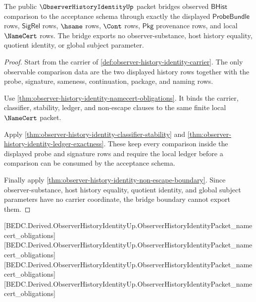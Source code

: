 \begin{theorem}
\label{thm:observer-history-identity-bridge-boundary}
The public $\ObserverHistoryIdentityUp$ packet bridges observed $\mathsf{BHist}$
comparison to the acceptance schema through exactly the displayed
$\mathsf{ProbeBundle}$ rows, $\mathsf{SigRel}$ rows, $\hsame$ rows, $\Cont$
rows, $\mathsf{Pkg}$ provenance rows, and local $\NameCert$ rows. The bridge
exports no observer-substance, host history equality, quotient identity, or
global subject parameter.
\end{theorem}
\begin{proof}
Start from the carrier of \autoref{def:observer-history-identity-carrier}. The
only observable comparison data are the two displayed history rows together
with the probe, signature, sameness, continuation, package, and naming rows.

Use \autoref{thm:observer-history-identity-namecert-obligations}. It binds the
carrier, classifier, stability, ledger, and non-escape clauses to the same
finite local $\NameCert$ packet.

Apply \autoref{thm:observer-history-identity-classifier-stability} and
\autoref{thm:observer-history-identity-ledger-exactness}. These keep every
comparison inside the displayed probe and signature rows and require the local
ledger before a comparison can be consumed by the acceptance schema.

Finally apply \autoref{thm:observer-history-identity-non-escape-boundary}. Since
observer-substance, host history equality, quotient identity, and global subject
parameters have no carrier coordinate, the bridge boundary cannot export them.
\end{proof}

[BEDC.Derived.ObserverHistoryIdentityUp.ObserverHistoryIdentityPacket\_namecert\_obligations]
[BEDC.Derived.ObserverHistoryIdentityUp.ObserverHistoryIdentityPacket\_namecert\_obligations]
[BEDC.Derived.ObserverHistoryIdentityUp.ObserverHistoryIdentityPacket\_namecert\_obligations]
[BEDC.Derived.ObserverHistoryIdentityUp.ObserverHistoryIdentityPacket\_namecert\_obligations]

